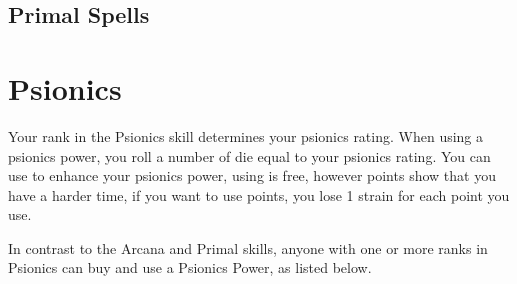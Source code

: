 \begin{multicols}{2}

\subsection{Primal Spells}





\FloatBarrier

\section{Psionics}
Your rank in the Psionics skill determines your psionics rating.
When using a psionics power, you roll a number of \force die equal to your
psionics rating. You can use \darklight to enhance your psionics power,
using \light is free, however \dark points show that you have a harder time,
if you want to use \dark points, you lose 1 strain for each \dark point you
use.

In contrast to the Arcana and Primal skills, anyone with one or more ranks
in Psionics can buy and use a Psionics Power, as listed below.

\end{multicols}
\newpage



%



